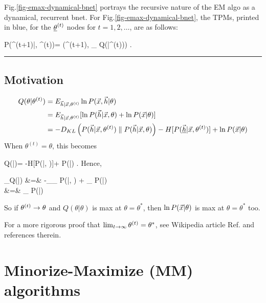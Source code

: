 Fig.\ref{fig-emax-dynamical-bnet}
portrays the
recursive nature of
the EM algo as a dynamical, recurrent bnet.
For Fig.\ref{fig-emax-dynamical-bnet},
the TPMs, printed in blue,
for the
$\underline{\theta}^{(t)}$
nodes for $t=1, 2, \ldots$, are
as follows:

\beq\color{blue}
P(\theta^{(t+1)}|\vecx, \theta^{(t)})=
\delta(\theta^{(t+1)}, \argmax_\theta
 Q(\theta|\theta^{(t)}))
\;.
\eeq

\hrule
\subsection{Motivation}

\begin{align}
Q(\theta|\theta^{(t)})
&=
E_{{\vec{h}}|{\vec{x}},\theta^{(t)}}
\ln P({\vec{x}},{\vec{h}}|\theta)
\\
&=
E_{{\vec{h}}|{\vec{x}},\theta^{(t)}}[
\ln P({\vec{h}}|{\vec{x}}, \theta)
+\ln P({\vec{x}}|\theta)]
\\
&=
-D_{KL}\left(
P({\vec{h}}|{\vec{x}}, \theta^{(t)})
\parallel
P({\vec{h}}|{\vec{x}}, \theta)
\right)
-H[P(\underline{{\vec{h}}}|{\vec{x}}, \theta^{(t)})]
+\ln P({\vec{x}}|\theta)
\label{eq-Q-decomposed}
\end{align}
When $\theta^{(t)}=\theta$,
this becomes

\beq
Q(\theta|\theta)=
-H[P(\ul{\vech}|\vecx, \theta)]+
\ln P(\vecx|\theta)
\;.
\eeq
Hence,

\beqa
\partial_\theta Q(\theta|\theta)
&=&
-\sum_{\vech}\partial_\theta
P(\ul{\vech}|\vecx, \theta)
+
\partial_\theta
\ln P(\vecx|\theta)
\\
&=&
\partial_\theta
\ln P(\vecx|\theta)
\eeqa

So if $\theta^{(t)}\rightarrow \theta$
and $Q(\theta|\theta)$ is max at $\theta=\theta^*$,
then $\ln P({\vec{x}}|\theta)$
is max at $\theta=\theta^*$ too.

For a  more rigorous proof
that $\lim_{t\rightarrow \infty}\theta^{(t)}
=\theta^*$,
see Wikipedia article Ref.\cite{wiki-em}
and references therein.

\section{Minorize-Maximize (MM) algorithms}


